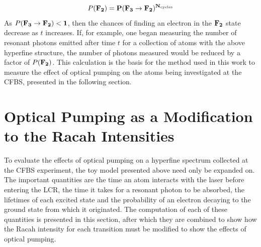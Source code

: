 \begin{equation}
P(\bf{F}_2) = P(\bf{F}_3 \rightarrow \bf{F}_2)^{N_{\mathrm{cycles}}}
\end{equation}
As $P(\bf{F}_3 \rightarrow \bf{F}_2) < 1$, then the chances of finding an electron in the $\bf{F}_2$ state decrease as $t$ increases. If, for example, one began measuring the number of resonant photons emitted after time $t$ for a collection of atoms with the above hyperfine structure, the number of photons measured would be reduced by a factor of $P(\bf{F}_2)$. This calculation is the basis for the method used in this work to measure the effect of optical pumping on the atoms being investigated at the CFBS, presented in the following section.

\section{Optical Pumping as a Modification to the Racah Intensities}
To evaluate the effects of optical pumping on a hyperfine spectrum collected at the CFBS experiment, the toy model presented above need only be expanded on. The important quantities are the time an atom interacts with the laser before entering the LCR, the time it takes for a resonant photon to be absorbed, the lifetimes of each excited state and the probability of an electron decaying to the ground state from which it originated. The computation of each of these quantities is presented in this section, after which they are combined to show how the Racah intensity for each transition must be modified to show the effects of optical pumping.


